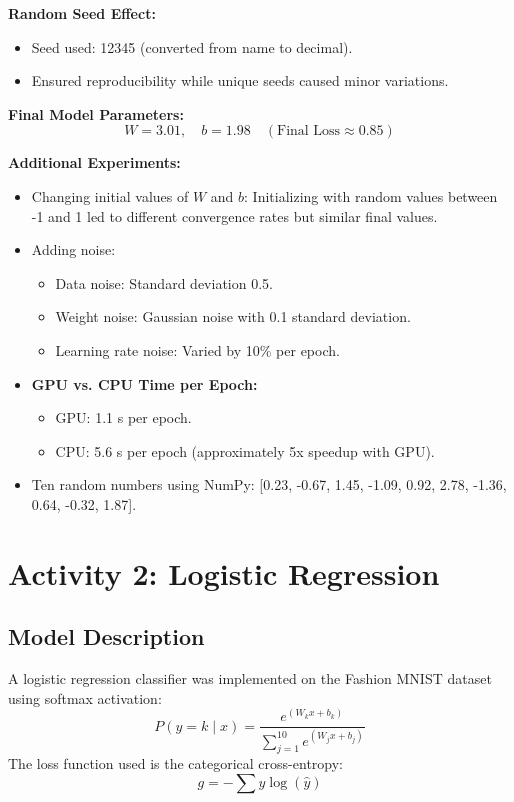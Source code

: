 \documentclass[11pt]{article}
\begin{document}
\textbf{Random Seed Effect:}
\begin{itemize}
    \item Seed used: 12345 (converted from name to decimal).
    \item Ensured reproducibility while unique seeds caused minor variations.
\end{itemize}

\textbf{Final Model Parameters:}
\[
W=3.01, \quad b=1.98 \quad (\text{Final Loss} \approx 0.85)
\]

\textbf{Additional Experiments:}
\begin{itemize}
    \item Changing initial values of \(W\) and \(b\): Initializing with random values between -1 and 1 led to different convergence rates but similar final values.
    \item Adding noise:
    \begin{itemize}
        \item Data noise: Standard deviation 0.5.
        \item Weight noise: Gaussian noise with 0.1 standard deviation.
        \item Learning rate noise: Varied by 10\% per epoch.
    \end{itemize}
    \item \textbf{GPU vs. CPU Time per Epoch:} 
    \begin{itemize}
        \item GPU: 1.1 s per epoch.
        \item CPU: 5.6 s per epoch (approximately 5x speedup with GPU).
    \end{itemize}
    \item Ten random numbers using NumPy: [0.23, -0.67, 1.45, -1.09, 0.92, 2.78, -1.36, 0.64, -0.32, 1.87].
\end{itemize}

\section{Activity 2: Logistic Regression}

\subsection{Model Description}
A logistic regression classifier was implemented on the Fashion MNIST dataset using softmax activation:
\[
P(y=k\mid x)=\frac{e^{(W_k x + b_k)}}{\sum_{j=1}^{10} e^{(W_j x + b_j)}}
\]
The loss function used is the categorical cross-entropy:
\[
g=-\sum y \log(\hat{y})
\]
\end{document}
